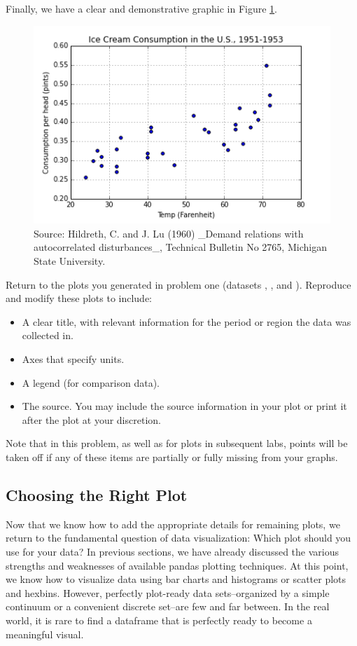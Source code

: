 Finally, we have a clear and demonstrative graphic in Figure \ref{fig:labels}.

\begin{figure}[H] 
    \centering
    \includegraphics[width=.75\textwidth]{Icecream.png}
    \caption{Source:  Hildreth, C. and J. Lu (1960) \_Demand relations with autocorrelated disturbances\_, Technical Bulletin No 2765, Michigan State University.}
    \label{fig:labels}
\end{figure}

\begin{problem}
Return to the plots you generated in problem one (datasets , , and ).
Reproduce and modify these plots to include:
\begin{itemize}
\item A clear title, with relevant information for the period or region the data was collected in.
\item Axes that specify units.
\item A legend (for comparison data).
\item The source. You may include the source information in your plot or print it after the plot at your discretion.
\end{itemize}
Note that in this problem, as well as for plots in subsequent labs, points will be taken off if any of these items are partially or fully missing from your graphs.
\end{problem}


\subsection*{Choosing the Right Plot}
Now that we know how to add the appropriate details for remaining plots, we return to the fundamental question of data visualization: Which plot should you use for your data? 
In previous sections, we have already discussed the various strengths and weaknesses of available pandas plotting techniques.
At this point, we know how to visualize data using bar charts and histograms or scatter plots and hexbins. 
However, perfectly plot-ready data sets--organized by a simple continuum or a convenient discrete set--are few and far between.
In the real world, it is rare to find a dataframe that is perfectly ready to become a meaningful visual.

